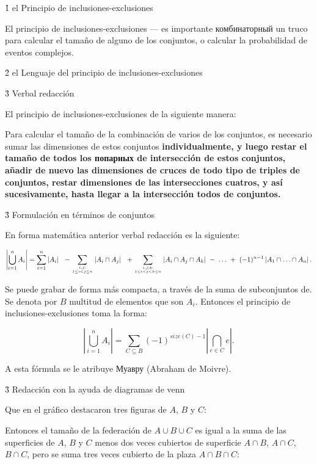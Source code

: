 \h1{ el Principio de inclusiones-exclusiones }

El principio de inclusiones-exclusiones --- es importante комбинаторный un truco para calcular el tamaño de alguno de los conjuntos, o calcular la probabilidad de eventos complejos.


\h2{ el Lenguaje del principio de inclusiones-exclusiones }


\h3{ Verbal redacción }

El principio de inclusiones-exclusiones de la siguiente manera:

Para calcular el tamaño de la combinación de varios de los conjuntos, es necesario sumar las dimensiones de estos conjuntos \bf{individualmente}, y luego restar el tamaño de todos los \bf{попарных} de intersección de estos conjuntos, añadir de nuevo las dimensiones de cruces de todo tipo de \bf{triples} de conjuntos, restar dimensiones de las intersecciones \bf{cuatros}, y así sucesivamente, hasta llegar a la intersección \bf{todos} de conjuntos.


\h3{ Formulación en términos de conjuntos }

En forma matemática anterior verbal redacción es la siguiente:

$$ \left| \bigcup_{i=1}^n A_i \right| = \sum_{i=1}^n \left| A_i \right| ~~ - \sum_{i,j : \atop 1 \le i < j \le n} \left| A_i \cap A_j \right| ~~ + \sum_{i,j,k : \atop 1 \le i < j < k \le n} \left| A_i \cap A_j \cap A_k \right| ~ - ~ \ldots ~ + ~ (-1)^{n-1} \left| A_1 \cap \ldots \cap A_n \right|. $$

Se puede grabar de forma más compacta, a través de la suma de subconjuntos de. Se denota por $B$ multitud de elementos que son $A_i$. Entonces el principio de inclusiones-exclusiones toma la forma:

$$ \left| \bigcup_{i=1}^n A_i \right| = \sum_{C \subseteq B} (-1)^{size(C)-1} \left| \bigcap_{e \in C} e \right|. $$

A esta fórmula se le atribuye Муавру (Abraham de Moivre).


\h3{ Redacción con la ayuda de diagramas de venn }

Que en el gráfico destacaron tres figuras de $A$, $B$ y $C$:


Entonces el tamaño de la federación de $A \cup B \cup C$ es igual a la suma de las superficies de $A$, $B$ y $C$ menos dos veces cubiertos de superficie $A \cap B$, $A \cap C$, $B \cap C$, pero se suma tres veces cubierto de la plaza $A \cap B \cap C$:

